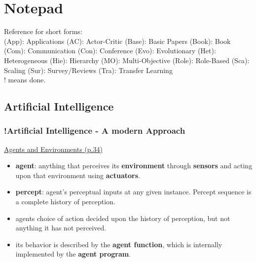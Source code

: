 
\chapter{Notepad}
\label{ch:Notepad}

Reference for short forms: \\
(App): Applications
(AC): Actor-Critic
(Base): Basic Papers
(Book): Book
(Com): Communication
(Con): Conference
(Evo): Evolutionary
(Het): Heterogeneous
(Hie): Hierarchy
(MO): Multi-Objective
(Role): Role-Based
(Sca): Scaling
(Sur): Survey/Reviews
(Tra): Transfer Learning\\
! means done.

\section{Artificial Intelligence}
\subsection{!Artificial Intelligence - A modern Approach}
\underline{Agents and Environments (p.34)}
\begin{itemize}[noitemsep,nolistsep]
	\item \textbf{agent}: anything that perceives its \textbf{environment} through \textbf{sensors} and acting upon that environment using \textbf{actuators}.
	\item \textbf{percept}: agent’s perceptual inputs at any given instance. Percept sequence is a complete history of perception.
	\item agents choice of action decided upon the history of perception, but not anything it has not perceived.
	\item its behavior is described by the \textbf{agent function}, which is internally implemented by the \textbf{agent program}.
\end{itemize}

